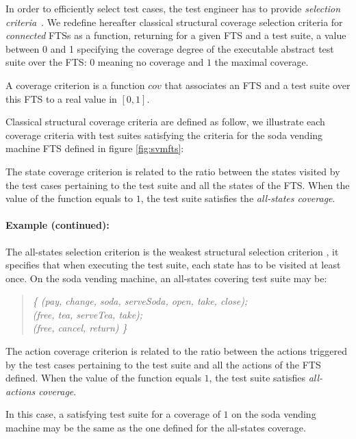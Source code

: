 \label{sec:coverage:structuralcrit}

In order to efficiently select test cases, the test engineer has to provide \emph{selection criteria}~\cite{Mathur2008,Utting2007}.
%
We redefine hereafter classical structural coverage selection criteria for \emph{connected} FTSs as a function, returning for a given FTS and a test suite, a value between 0 and 1 specifying the coverage degree of the executable abstract test suite over the FTS: $0$ meaning no coverage and $1$ the maximal coverage. 

\begin{definition}
A coverage criterion is a function $cov$ that associates an FTS and a test suite over this FTS to a real value in $[0,1]$.
\end{definition}

Classical structural coverage criteria are defined as follow, we illustrate each coverage criteria with test suites satisfying the criteria for the \gls{soda vending machine} FTS defined in figure \ref{fig:svmfts}:

\begin{definition}
The state coverage criterion is related to the ratio between the states visited by the test cases pertaining to the test suite and all the states of the FTS. When the value of the function equals to $1$, the test suite satisfies the \emph{all-states coverage}.    
\end{definition}

\paragraph{Example (continued):} 

The all-states selection criterion is the weakest structural selection criterion \cite{Utting2007}, it specifies that when executing the test suite, each state has to be visited at least once. On the soda vending machine, an all-states covering test suite may be: 
\begin{quote}
\textit{\{ (pay, change, soda, serveSoda, open, take, close); \\
(free, tea, serveTea, take);\\
(free, cancel, return) \}}
\end{quote}

\begin{definition}
The action coverage criterion is related to the ratio between the actions triggered by the test cases pertaining to the test suite and all the actions of the FTS defined. When the value of the function equals $1$, the test suite satisfies \emph{all-actions coverage}.    
\end{definition}
%
In this case, a satisfying test suite for a coverage of $1$ on the soda vending machine may be the same as the one defined for the all-states coverage.  

